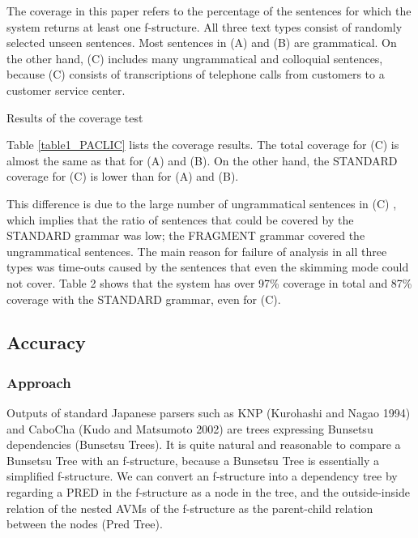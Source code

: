 \documentclass[english]{jnlp_1.4_rep}
\begin{document}
The coverage in this paper refers to the percentage of the sentences
for which the system returns at least one f-structure.  All three text
types consist of randomly selected unseen sentences.  Most sentences
in (A) and (B) are grammatical.  On the other hand, (C) includes many
ungrammatical and colloquial sentences, because (C) consists of
transcriptions of telephone calls from customers to a customer service
center.

\begin{table}[b]
\caption{Results of the coverage test}
\label{table1_PACLIC}

\end{table}



\addtocounter{footnote}{1}
Table \ref{table1_PACLIC} lists the coverage results.  The total
coverage for (C) is almost the same as that for (A) and (B).  On the
other hand, the STANDARD coverage for (C) is lower than for (A) and (B).

This difference is due to the large number of ungrammatical sentences
in (C) , which implies that the ratio of sentences that could be
covered by the STANDARD grammar was low; the FRAGMENT grammar covered
the ungrammatical sentences.  The main reason for failure of analysis
in all three types was time-outs caused by the sentences that even the
skimming mode could not cover.  Table 2 shows that the system has
over 97\% coverage in total and 87\% coverage with the STANDARD
grammar, even for (C).


\subsection{Accuracy}
\label{Accuracy}

\subsubsection{Approach}

Outputs of standard Japanese parsers such as KNP (Kurohashi and Nagao 
1994) and CaboCha (Kudo and Matsumoto 2002) are trees expressing
Bunsetsu dependencies (Bunsetsu Trees).  It is quite natural and
reasonable to compare a Bunsetsu Tree with an f-structure, because a
Bunsetsu Tree is essentially a simplified f-structure.  We can convert
an f-structure into a dependency tree by regarding a PRED in the
f-structure as a node in the tree, and the outside-inside relation of
the nested AVMs of the f-structure as the parent-child relation
between the nodes (Pred Tree).
\end{document}
